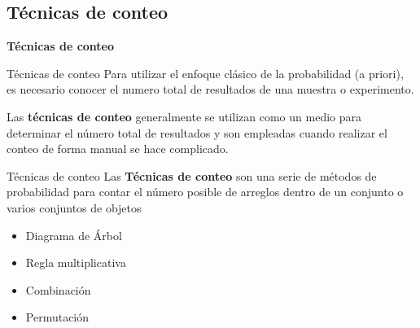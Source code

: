 \documentclass[11pt]{beamer}
\begin{document}
      \subsection*{Técnicas de conteo}

        \begin{frame}{}
           \begin{center}
               \textbf{\huge Técnicas de conteo}
           \end{center}
        \end{frame}

        \begin{frame}{Técnicas de conteo}
            Para utilizar el enfoque clásico de la probabilidad (a priori), es necesario conocer el numero total de resultados de una muestra o experimento.

            Las \textbf{técnicas de conteo} generalmente se utilizan como un medio para determinar el número total de resultados y son empleadas cuando realizar el conteo de forma manual se hace complicado.
            \pause
            \begin{block}{Técnicas de conteo}
                Las \textbf{Técnicas de conteo} son una serie de métodos de probabilidad para contar el número posible de arreglos dentro de un conjunto o varios conjuntos de objetos
            \end{block}
            \begin{itemize}
                \item Diagrama de Árbol
                \item Regla multiplicativa
                \item Combinación
                \item Permutación
            \end{itemize}
        \end{frame}
\end{document}
